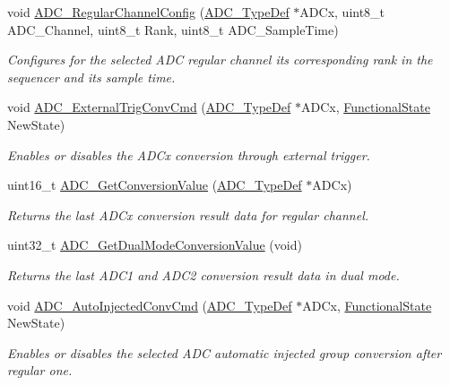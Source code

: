 \begin{DoxyCompactItemize}
void \hyperlink{group___a_d_c___private___functions_gac531adb577b648d4bb8881f2ed627d52}{A\+D\+C\+\_\+\+Regular\+Channel\+Config} (\hyperlink{struct_a_d_c___type_def}{A\+D\+C\+\_\+\+Type\+Def} $\ast$A\+D\+Cx, uint8\+\_\+t A\+D\+C\+\_\+\+Channel, uint8\+\_\+t Rank, uint8\+\_\+t A\+D\+C\+\_\+\+Sample\+Time)
\begin{DoxyCompactList}\small\item\em Configures for the selected A\+DC regular channel its corresponding rank in the sequencer and its sample time. \end{DoxyCompactList}\item 
void \hyperlink{group___a_d_c___private___functions_ga3ae92d7940a16c898223374a5857f509}{A\+D\+C\+\_\+\+External\+Trig\+Conv\+Cmd} (\hyperlink{struct_a_d_c___type_def}{A\+D\+C\+\_\+\+Type\+Def} $\ast$A\+D\+Cx, \hyperlink{group___exported__types_gac9a7e9a35d2513ec15c3b537aaa4fba1}{Functional\+State} New\+State)
\begin{DoxyCompactList}\small\item\em Enables or disables the A\+D\+Cx conversion through external trigger. \end{DoxyCompactList}\item 
uint16\+\_\+t \hyperlink{group___a_d_c___private___functions_gaaf74221c285ec5dab5e66baf7bec6bd3}{A\+D\+C\+\_\+\+Get\+Conversion\+Value} (\hyperlink{struct_a_d_c___type_def}{A\+D\+C\+\_\+\+Type\+Def} $\ast$A\+D\+Cx)
\begin{DoxyCompactList}\small\item\em Returns the last A\+D\+Cx conversion result data for regular channel. \end{DoxyCompactList}\item 
uint32\+\_\+t \hyperlink{group___a_d_c___private___functions_gac5a4792dc29ef7ff6bfbce9f37e8a668}{A\+D\+C\+\_\+\+Get\+Dual\+Mode\+Conversion\+Value} (void)
\begin{DoxyCompactList}\small\item\em Returns the last A\+D\+C1 and A\+D\+C2 conversion result data in dual mode. \end{DoxyCompactList}\item 
void \hyperlink{group___a_d_c___private___functions_ga1ff9c3b8e4bbdd2addfd227f1a506a66}{A\+D\+C\+\_\+\+Auto\+Injected\+Conv\+Cmd} (\hyperlink{struct_a_d_c___type_def}{A\+D\+C\+\_\+\+Type\+Def} $\ast$A\+D\+Cx, \hyperlink{group___exported__types_gac9a7e9a35d2513ec15c3b537aaa4fba1}{Functional\+State} New\+State)
\begin{DoxyCompactList}\small\item\em Enables or disables the selected A\+DC automatic injected group conversion after regular one. \end{DoxyCompactList}\item 

\end{DoxyCompactItemize}
